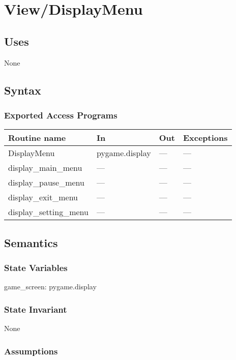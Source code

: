\documentclass[12pt]{article}
\begin{document}
\section*{View/DisplayMenu}

\subsection* {Uses}
None

\subsection* {Syntax}

\subsubsection* {Exported Access Programs}

\begin{tabular}{| l | l | l | l |}
\hline
\textbf{Routine name} & \textbf{In} & \textbf{Out} & \textbf{Exceptions}\\
\hline
    DisplayMenu & pygame.display & --- & ---\\
\hline
    display\_main\_menu & --- & --- & ---\\
\hline
    display\_pause\_menu & --- & --- & ---\\
\hline
    display\_exit\_menu & --- & --- & ---\\
\hline
     display\_setting\_menu & --- & --- & ---\\
\hline
\end{tabular}

\subsection* {Semantics}

\subsubsection* {State Variables}

game\_screen: pygame.display

\subsubsection* {State Invariant}

None

\subsubsection* {Assumptions}
\end{document}
